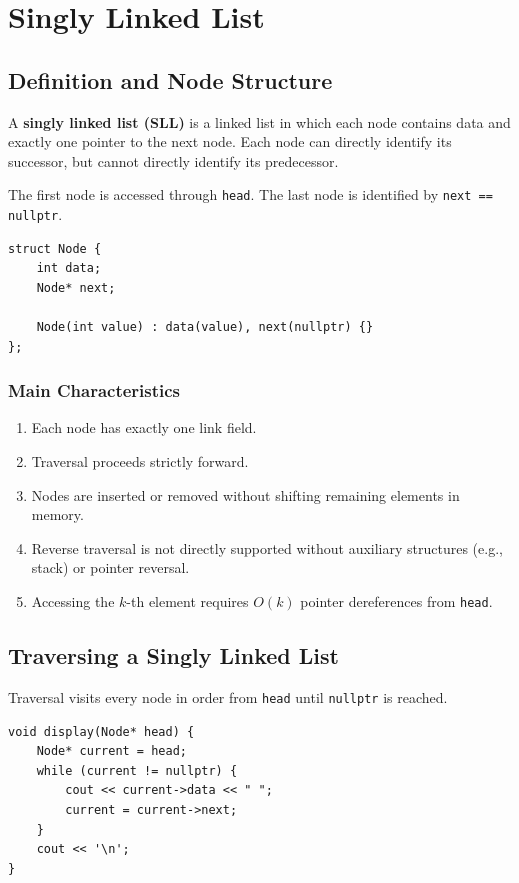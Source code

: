 \section{Singly Linked List}

\subsection{Definition and Node Structure}

A \textbf{singly linked list (SLL)} is a linked list in which each node contains data and exactly one pointer to the next node. Each node can directly identify its successor, but cannot directly identify its predecessor.

The first node is accessed through \texttt{head}. The last node is identified by \texttt{next == nullptr}.

\begin{lstlisting}[style=cppstyle]
struct Node {
    int data;
    Node* next;

    Node(int value) : data(value), next(nullptr) {}
};
\end{lstlisting}

\subsubsection{Main Characteristics}
\begin{enumerate}
    \item Each node has exactly one link field.
    \item Traversal proceeds strictly forward.
    \item Nodes are inserted or removed without shifting remaining elements in memory.
    \item Reverse traversal is not directly supported without auxiliary structures (e.g., stack) or pointer reversal.
    \item Accessing the $k$-th element requires $O(k)$ pointer dereferences from \texttt{head}.
\end{enumerate}

\subsection{Traversing a Singly Linked List}

Traversal visits every node in order from \texttt{head} until \texttt{nullptr} is reached.

\begin{lstlisting}[style=cppstyle]
void display(Node* head) {
    Node* current = head;
    while (current != nullptr) {
        cout << current->data << " ";
        current = current->next;
    }
    cout << '\n';
}
\end{lstlisting}

